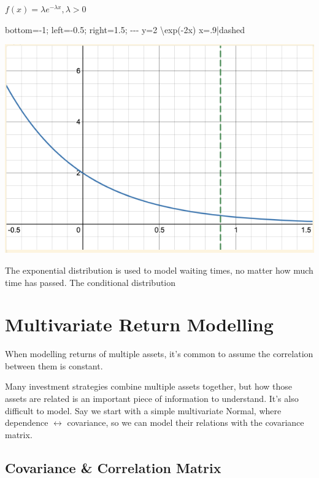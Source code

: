\documentclass[
  oneside]{book}
\newenvironment{Shaded}{\begin{snugshade}}{\end{snugshade}}
\newcommand{\NormalTok}[1]{#1}
\begin{document}
\(f(x) = \lambda e^{-\lambda x}, \lambda>0\)

\begin{Shaded}
\begin{Highlighting}[]
\NormalTok{bottom={-}1; left={-}0.5; right=1.5;}
\NormalTok{{-}{-}{-}}
\NormalTok{y=2 \textbackslash{}exp({-}2x)}
\NormalTok{x=.9|dashed}
\end{Highlighting}
\end{Shaded}

\includegraphics{Notes/Obsidian-Attachments/3-Modelling-Extreme-Events-1.png}

The exponential distribution is used to model waiting times, no matter how much time has passed. The conditional distribution

\hypertarget{multivariate-return-modelling}{%
\chapter{Multivariate Return Modelling}\label{multivariate-return-modelling}}

When modelling returns of multiple assets, it's common to assume the correlation between them is constant.

Many investment strategies combine multiple assets together, but how those assets are related is an important piece of information to understand. It's also difficult to model. Say we start with a simple multivariate Normal, where dependence \(\leftrightarrow\) covariance, so we can model their relations with the covariance matrix.

\hypertarget{covariance-correlation-matrix}{%
\section{Covariance \& Correlation Matrix}\label{covariance-correlation-matrix}}
\end{document}
